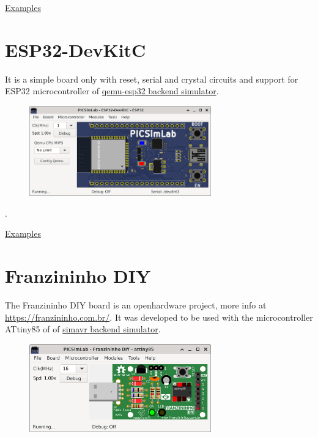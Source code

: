 \href{https://lcgamboa.github.io/picsimlab_examples/board_ESP32_C3_DevKitC_02.html}{Examples}


\section{ESP32-DevKitC}

It is a simple board only with reset, serial and crystal circuits and support 
for ESP32 microcontroller of \hyperlink{def:qemu-esp32}{qemu-esp32 backend simulator}.

\begin{figure}[H]
\center
\includegraphics[width=0.7\textwidth]{img/DevKitC.png} 
\end{figure} 

.\vspace{0.5cm}

\href{https://lcgamboa.github.io/picsimlab_examples/board_ESP32_DevKitC.html}{Examples}


\section{Franzininho DIY}

The Franzininho DIY board is an openhardware project, more info at \href{https://franzininho.com.br/}{https://franzininho.com.br/}.
It was developed to be used with the microcontroller ATtiny85 of 
of \hyperlink{def:simavr}{simavr backend simulator}.

\begin{figure}[H]
\center
\includegraphics[width=0.7\textwidth]{img/board_Franzininho_DIY.png} 
\end{figure} 

